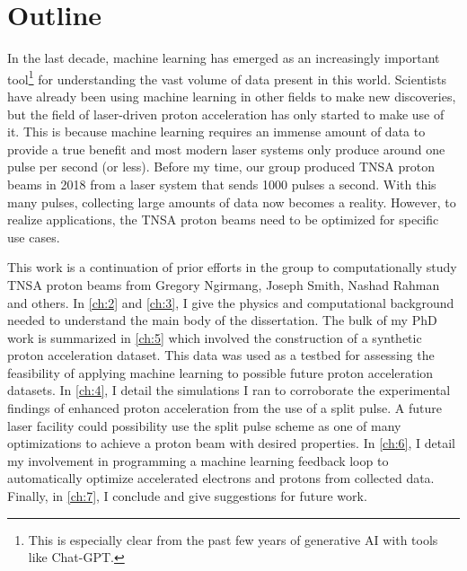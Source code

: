 \section{Outline}
In the last decade, machine learning has emerged as an increasingly important tool\footnote{This is especially clear from the past few years of generative AI with tools like Chat-GPT.} for understanding the vast volume of data present in this world. Scientists have already been using machine learning in other fields to make new discoveries, but the field of laser-driven proton acceleration has only started to make use of it. This is because machine learning requires an immense amount of data to provide a true benefit \cite{Dopp_2023_HPLSE} and most modern laser systems only produce around one pulse per second (or less). Before my time, our group produced \gls{TNSA} proton beams in 2018 \cite{Morrison_2018_NJoP} from a laser system that sends 1000 pulses a second. With this many pulses, collecting large amounts of data now becomes a reality. However, to realize applications, the \gls{TNSA} proton beams need to be optimized for specific use cases. 

This work is a continuation of prior efforts in the group to computationally study \gls{TNSA} proton beams from Gregory Ngirmang, Joseph Smith, Nashad Rahman and others. In \autoref{ch:2} and \autoref{ch:3}, I give the physics and computational background needed to understand the main body of the dissertation. The bulk of my PhD work is summarized in \autoref{ch:5} which involved the construction of a synthetic proton acceleration dataset. This data was used as a testbed for assessing the feasibility of applying machine learning to possible future proton acceleration datasets. In \autoref{ch:4}, I detail the simulations I ran to corroborate the experimental findings of enhanced proton acceleration from the use of a split pulse. A future laser facility could possibility use the split pulse scheme as one of many optimizations to achieve a proton beam with desired properties. In \autoref{ch:6}, I detail my involvement in programming a machine learning feedback loop to automatically optimize accelerated electrons and protons from collected data. Finally, in \autoref{ch:7}, I conclude and give suggestions for future work.


